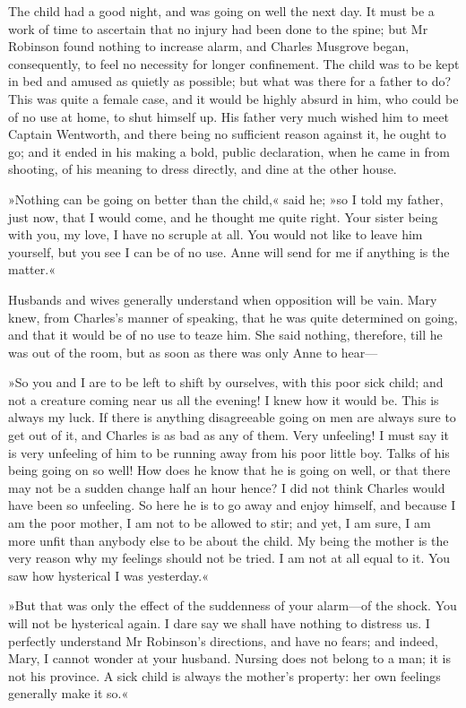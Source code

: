 The child had a good night, and was going on well the next day. It must be a work of time to ascertain that no injury had been done to the spine; but Mr Robinson found nothing to increase alarm, and Charles Musgrove began, consequently, to feel no necessity for longer confinement. The child was to be kept in bed and amused as quietly as possible; but what was there for a father to do? This was quite a female case, and it would be highly absurd in him, who could be of no use at home, to shut himself up. His father very much wished him to meet Captain Wentworth, and there being no sufficient reason against it, he ought to go; and it ended in his making a bold, public declaration, when he came in from shooting, of his meaning to dress directly, and dine at the other house.

»Nothing can be going on better than the child,« said he; »so I told my father, just now, that I would come, and he thought me quite right. Your sister being with you, my love, I have no scruple at all. You would not like to leave him yourself, but you see I can be of no use. Anne will send for me if anything is the matter.«

Husbands and wives generally understand when opposition will be vain. Mary knew, from Charles's manner of speaking, that he was quite determined on going, and that it would be of no use to teaze him. She said nothing, therefore, till he was out of the room, but as soon as there was only Anne to hear—

»So you and I are to be left to shift by ourselves, with this poor sick child; and not a creature coming near us all the evening! I knew how it would be. This is always my luck. If there is anything disagreeable going on men are always sure to get out of it, and Charles is as bad as any of them. Very unfeeling! I must say it is very unfeeling of him to be running away from his poor little boy. Talks of his being going on so well! How does he know that he is going on well, or that there may not be a sudden change half an hour hence? I did not think Charles would have been so unfeeling. So here he is to go away and enjoy himself, and because I am the poor mother, I am not to be allowed to stir; and yet, I am sure, I am more unfit than anybody else to be about the child. My being the mother is the very reason why my feelings should not be tried. I am not at all equal to it. You saw how hysterical I was yesterday.«

»But that was only the effect of the suddenness of your alarm—of the shock. You will not be hysterical again. I dare say we shall have nothing to distress us. I perfectly understand Mr Robinson's directions, and have no fears; and indeed, Mary, I cannot wonder at your husband. Nursing does not belong to a man; it is not his province. A sick child is always the mother's property: her own feelings generally make it so.«

